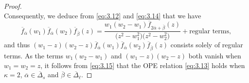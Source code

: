 \documentclass[pdftex]{sigma}
\numberwithin{equation}{section}
\begin{document}
\begin{proof}
\begin{equation}
\end{equation}
Consequently, we deduce from \eqref{eq:3.12} and \eqref{eq:3.14} that we have
\begin{equation}\label{eq:3.15}
\overline{f}_{\overline{\alpha}}(w_1) \overline{f}_{\overline{\alpha}}(w_2)
\overline{f}_{\overline{\beta}}(z)
=\frac{w_1(w_2-w_1)\overline{f}_{2\overline{\alpha}+ \overline{\beta}}(z)}{\bigl(z^2-w_1^2\bigr)\bigl(z^2-w_2^2\bigr)}+\text{regular terms},
\end{equation}
and thus $(w_1-z)(w_2-z)\overline{f}_{\overline{\alpha}}(w_1) \overline{f}_{\overline{\alpha}}(w_2) \overline{f}_{\overline{\beta}}(z)$ consists solely of regular terms. As the terms $w_1(w_2-w_1)$ and $(w_1-z)(w_2-z)$ both vanish when $w_1=w_2=z$, it follows from \eqref{eq:3.15} that the OPE relation \eqref{eq:3.13} holds when $\kappa=2$, $\overline{\alpha}\in\overline{\Delta}_s$ and $\overline{\beta}\in\overline{\Delta}_{\ell}$.


\end{proof}
\end{document}
